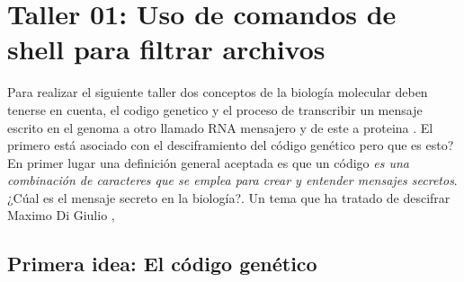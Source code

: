 \documentclass[10pt]{article}
\begin{document}
\section{Taller 01: Uso de comandos de shell para filtrar archivos}

Para realizar el siguiente taller dos conceptos de la biología molecular deben
tenerse en cuenta, el codigo genetico y el proceso de transcribir un mensaje
escrito en el genoma a otro llamado RNA mensajero y de este a proteina . El
primero está asociado con el desciframiento del código genético pero que es esto? En primer lugar una definición general aceptada es que un código \textit{es una combinación de caracteres que se emplea para crear y entender mensajes secretos}. ¿Cúal es el mensaje secreto en la biología?. Un tema que ha tratado de descifrar Maximo Di Giulio \cite{giulio1992}, \cite{giulio2016}
\subsection{Primera idea: El código genético}
\end{document}
